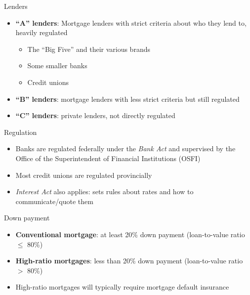 \documentclass{beamer}
\begin{document}
\begin{frame}{Lenders}

\begin{itemize}
\item \textbf{``A'' lenders}: Mortgage lenders with strict criteria about who they lend to, heavily regulated
  \begin{itemize}
  \item The ``Big Five'' and their various brands
  \item Some smaller banks
  \item Credit unions
  \end{itemize}
\item \textbf{``B'' lenders}: mortgage lenders with less strict criteria but still regulated
\item \textbf{``C'' lenders}: private lenders, not directly regulated
\end{itemize}

\end{frame}

\begin{frame}{Regulation}

\begin{itemize}
\item Banks are regulated federally under the \textit{Bank Act} and supervised by the Office of the Superintendent of Financial Institutions (OSFI)
\medskip
\item Most credit unions are regulated provincially
\medskip
\item \textit{Interest Act} also applies: sets rules about rates and how to communicate/quote them
\end{itemize}

\end{frame}

\begin{frame}{Down payment}

\begin{itemize}
\item \textbf{Conventional mortgage}: at least 20\% down payment (loan-to-value ratio $\le$ 80\%)
\medskip
\item \textbf{High-ratio mortgages}: less than 20\% down payment (loan-to-value ratio $>$ 80\%)
\medskip
\item High-ratio mortgages will typically require mortgage default insurance
\end{itemize}

\end{frame}
\end{document}
